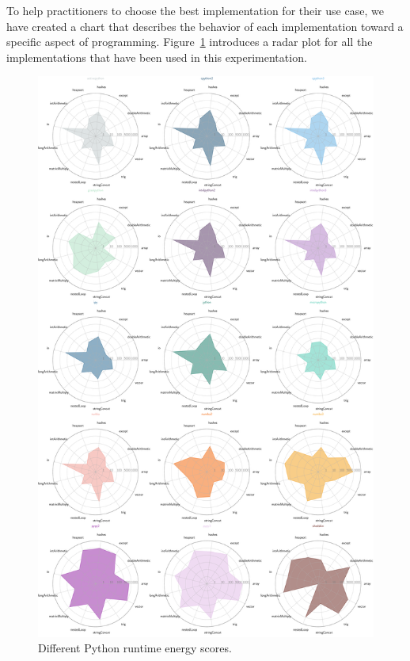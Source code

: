 To help practitioners to choose the best implementation for their use case, we have created a chart that describes the behavior of each implementation toward a specific aspect of programming.
Figure~\ref{fig:tommi_all} introduces a radar plot for all the implementations that have been used in this experimentation.

\begin{figure}[!htb]
      \centering
      \includegraphics[height=\textheight,keepaspectratio]{imgs/alltomti_performance}
      \caption{Different Python runtime energy scores.}
      \label{fig:tommi_all}
\end{figure}

